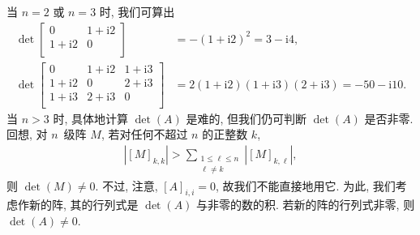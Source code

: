 \documentclass[../libro.tex]{subfiles}
\begin{document}
\begin{example}
    当 \(n = 2\) 或 \(n = 3\) 时, 我们可算出
    \begin{align*}
        \det
        \begin{bmatrix}
            0                & 1 + \mathrm{i} 2 \\
            1 + \mathrm{i} 2 & 0                \\
        \end{bmatrix}
        &
        = -(1 + \mathrm{i} 2)^2
        = 3 - \mathrm{i} 4,
        \\
        \det
        \begin{bmatrix}
            0                & 1 + \mathrm{i} 2 & 1 + \mathrm{i} 3 \\
            1 + \mathrm{i} 2 & 0                & 2 + \mathrm{i} 3 \\
            1 + \mathrm{i} 3 & 2 + \mathrm{i} 3 & 0                \\
        \end{bmatrix}
        &
        = 2 (1 + \mathrm{i} 2) (1 + \mathrm{i} 3) (2 + \mathrm{i} 3)
        = -50 - \mathrm{i} 10.
    \end{align*}
    当 \(n > 3\) 时,
    具体地计算 \(\det {(A)}\) 是难的,
    但我们仍可判断 \(\det {(A)}\) 是否非零.
    回想, 对 \(n\)~级阵 \(M\),
    若对任何不超过 \(n\) 的正整数 \(k\),
    \begin{align*}
        |[M]_{k,k}| >
        \sum_{\substack{1 \leq \ell \leq n \\
        \ell \neq k}} {|[M]_{k,\ell}|},
    \end{align*}
    则 \(\det {(M)} \neq 0\).
    不过, 注意, \([A]_{i,i} = 0\),
    故我们不能直接地用它.
    为此, 我们考虑作新的阵, 其的行列式是
    \(\det {(A)}\) 与非零的数的积.
    若新的阵的行列式非零, 则 \(\det {(A)} \neq 0\).


\end{example}
\end{document}
